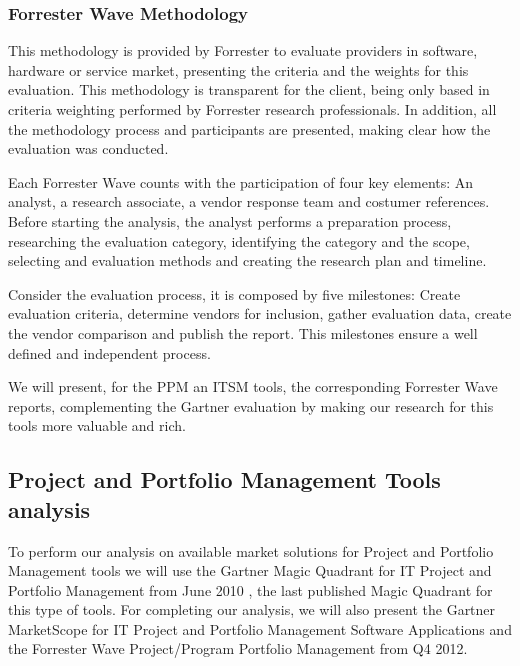 \subsubsection{Forrester Wave Methodology}

This methodology\cite{ForresterWave} is provided by Forrester to evaluate providers in software, hardware or service market, presenting the criteria and the weights for this evaluation. This methodology is transparent for the client, being only based in criteria weighting performed by Forrester research professionals. In addition, all the methodology process and participants are presented, making clear how the evaluation was conducted.\par
Each Forrester Wave counts with the participation of four key elements: An analyst, a research associate, a vendor response team and costumer references. Before starting the analysis, the analyst performs a preparation process, researching the evaluation category, identifying the category and the scope, selecting and evaluation methods and creating the research plan and timeline.\par
Consider the evaluation process, it is composed by five milestones: Create evaluation criteria, determine vendors for inclusion, gather evaluation data, create the vendor comparison and publish the report. This milestones ensure a well defined and independent process.\par
We will present, for the PPM an ITSM tools, the corresponding Forrester Wave reports, complementing the Gartner evaluation by making our research for this tools more valuable and rich.\par 

\subsection{Project and Portfolio Management Tools analysis}

To perform our analysis on available market solutions for Project and Portfolio Management tools we will use the Gartner Magic Quadrant for IT Project and Portfolio Management from June 2010 \cite{magicQuadrantPPM}, the last published Magic Quadrant for this type of tools. For completing our analysis, we will also present the Gartner MarketScope for IT Project and Portfolio Management Software Applications \cite{MarketScopePPM} and the Forrester Wave Project/Program Portfolio Management from Q4 2012.\cite{forresterWavePPM}\par 

